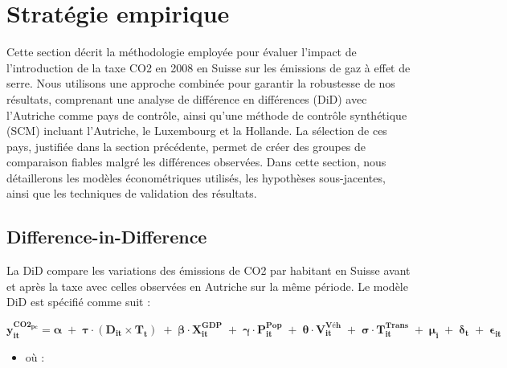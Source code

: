 \section{Stratégie empirique}
\label{sec:strategie}
Cette section décrit la méthodologie employée pour évaluer l'impact de l'introduction de la taxe CO2 en 2008 en Suisse sur les émissions de gaz à effet de serre. Nous utilisons une approche combinée pour garantir la robustesse de nos résultats, comprenant une analyse de différence en différences (DiD) avec l'Autriche comme pays de contrôle, ainsi qu'une méthode de contrôle synthétique (SCM) incluant l'Autriche, le Luxembourg et la Hollande. La sélection de ces pays, justifiée dans la section précédente, permet de créer des groupes de comparaison fiables malgré les différences observées. Dans cette section, nous détaillerons les modèles économétriques utilisés, les hypothèses sous-jacentes, ainsi que les techniques de validation des résultats.

\subsection{Difference-in-Difference}
\label{subsec:strategie_did}
La DiD compare les variations des émissions de CO2 par habitant en Suisse avant et après la taxe avec celles observées en Autriche sur la même période. Le modèle DiD est spécifié comme suit :

$$
\mathbf{y_{it}^{CO2_{pc}}} = \boldsymbol{\alpha} \; + \; \boldsymbol{\tau} \cdot (\mathbf{D_{it}} \times \mathbf{T_t}) \; + \; \boldsymbol{\beta} \cdot \mathbf{X_{it}^{GDP}} \; + \; \boldsymbol{\gamma} \cdot \mathbf{P_{it}^{Pop}} \; + \; \boldsymbol{\theta} \cdot \mathbf{V_{it}^{Véh}} \; + \; \boldsymbol{\sigma} \cdot \mathbf{T_{it}^{Trans}} \; + \; \boldsymbol{\mu_i} \; + \; \boldsymbol{\delta_t} \; + \; \mathbf{\epsilon_{it}}
$$

\vspace{-0.4cm}

\begin{itemize}
\item[] où : 
\end{itemize}

\vspace{-0.4cm}

